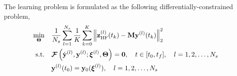 The learning problem is formulated as the following differentially-constrained problem,
\begin{subequations}
    \begin{align}
        \min_{\boldsymbol{\Theta}} &\quad \frac{1}{N_s}\sum_{l=1}^{N_s}\frac{1}{K}\sum_{k=0}^{K}\left\|\mathbf{z}^{(l)}_{\text{HF}}(t_k) - \mathbf{M}\mathbf{y}^{(l)}(t_k)\right\|_2^2 \\
        \text{s.t.} &\quad \boldsymbol{\mathcal{F}}\left(\dot{\mathbf{y}}^{(l)},\mathbf{y}^{(l)};\boldsymbol{\xi}^{(l)},\boldsymbol{\Theta}\right) = \boldsymbol{0},\quad t\in[t_0,t_f],\quad l=1,2,\dots,N_s\\
        &\quad \mathbf{y}^{(l)}(t_0) = \mathbf{y}_0(\boldsymbol{\xi}^{(l)}),\quad l=1,2,\dots,N_s
    \end{align}
\end{subequations}


